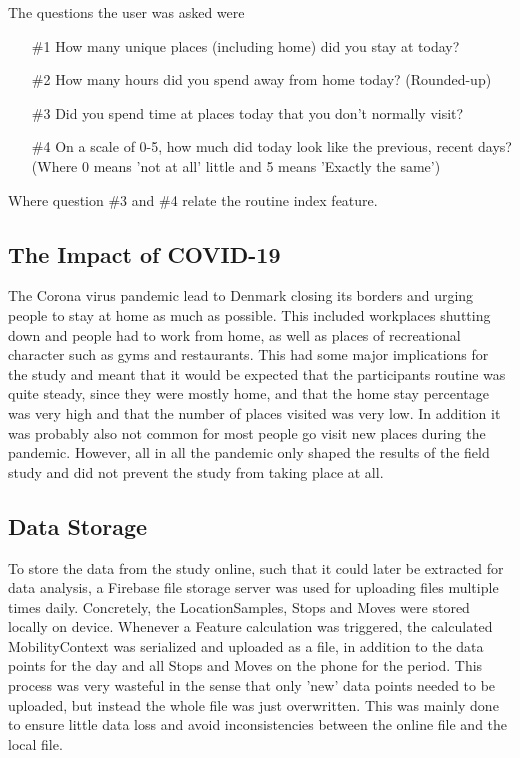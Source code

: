 The questions the user was asked were

\begin{itemize}
    \item[\#1] How many unique places (including home) did you stay at today?
    \item[\#2] How many hours did you spend away from home today? (Rounded-up)
    \item[\#3] Did you spend time at places today that you don't normally visit?
    \item[\#4] On a scale of 0-5, how much did today look like the previous, recent days? (Where 0 means 'not at all' little and 5 means 'Exactly the same')
   
\end{itemize}

Where question \#3 and \#4 relate the routine index feature.

\subsection{The Impact of COVID-19}
The Corona virus pandemic lead to Denmark closing its borders and urging people to stay at home as much as possible. This included workplaces shutting down and people had to work from home, as well as places of recreational character such as gyms and restaurants. This had some major implications for the study and meant that it would be expected that the participants routine was quite steady, since they were mostly home, and that the home stay percentage was very high and that the number of places visited was very low. In addition it was probably also not common for most people go visit new places during the pandemic. However, all in all the pandemic only shaped the results of the field study and did not prevent the study from taking place at all.

\subsection{Data Storage}
To store the data from the study online, such that it could later be extracted for data analysis, a Firebase file storage server was used for uploading files multiple times daily. Concretely, the LocationSamples, Stops and Moves were stored locally on device. Whenever a Feature calculation was triggered, the calculated MobilityContext was serialized and uploaded as a file, in addition to the data points for the day and all Stops and Moves on the phone for the period. This process was very wasteful in the sense that only 'new' data points needed to be uploaded, but instead the whole file was just overwritten. This was mainly done to ensure little data loss and avoid inconsistencies between the online file and the local file.
